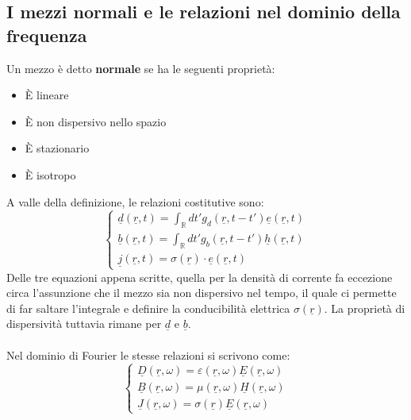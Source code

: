 \documentclass{book}
\begin{document}
    \subsection{I mezzi normali e le relazioni nel dominio della frequenza}
        Un mezzo è detto \textbf{normale} se ha le seguenti proprietà:
        \begin{itemize}
            \item È lineare
            \item È non dispersivo nello spazio
            \item È stazionario
            \item È isotropo
        \end{itemize}
        A valle della definizione, le relazioni costitutive sono:
        \begin{equation}
            \begin{cases}
                \displaystyle\underline{d}(\underline{r},t) = \int_{\mathbb{R}}dt' g_{d}(\underline{r}, t-t')\underline{e}(\underline{r},t) \\
                \displaystyle\underline{b}(\underline{r},t) = \int_{\mathbb{R}}dt' g_{b}(\underline{r}, t-t')\underline{h}(\underline{r},t) \\
                \underline{j}(\underline{r}, t) = \sigma (\underline{r}) \cdot \underline{e}(\underline{r},t)
            \end{cases}
        \end{equation}
        Delle tre equazioni appena scritte, quella per la densità di corrente fa eccezione circa l'assunzione che il mezzo sia non dispersivo nel tempo, il quale ci permette di far saltare l'integrale e definire la conducibilità elettrica $\sigma(\underline{r})$. La proprietà di dispersività tuttavia rimane per $\underline{d}$ e $\underline{b}$. \\ \\
        Nel dominio di Fourier le stesse relazioni si scrivono come:
        \begin{equation}
            \begin{cases}
            
            \underline{D}(\underline{r},\omega) = \varepsilon (\underline{r}, \omega) \underline{E}(\underline{r}, \omega) \\
            \underline{B}(\underline{r} ,\omega) = \mu ( \underline{r}, \omega)  \underline{H}(\underline{r}, \omega) \\
            \underline{J}(\underline{r} ,\omega) = \sigma(\underline{r}) \underline{E}(\underline{r}, \omega)
            \end{cases}
        \end{equation}
\end{document}
